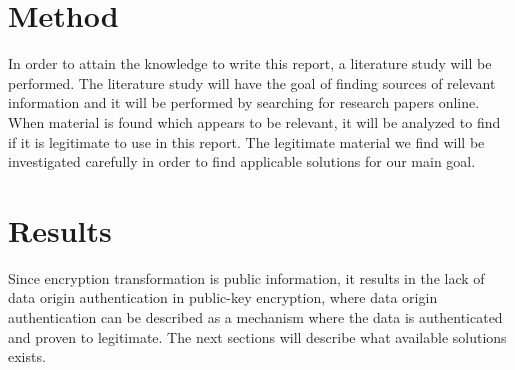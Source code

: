 \documentclass{acm_proc_article-sp}
\begin{document}
\section{Method} %
In order to attain the knowledge to write this report, a literature study will be performed. The literature study will have the goal of finding sources of relevant information and it will be performed by searching for research papers online. When material is found which appears to be relevant, it will be analyzed to find if it is legitimate to use in this report. The legitimate material we find will be investigated carefully in order to find applicable solutions for our main goal.   



\section{Results} %
Since encryption transformation is public information, it results in the lack of data origin authentication in public-key encryption, where data origin authentication can be described as a mechanism where the data is authenticated and proven to legitimate. \cite{handcrypt} 
The next sections will describe what available solutions exists. 
\end{document}
